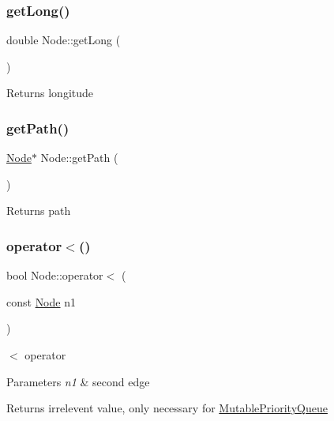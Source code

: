 \subsubsection{\texorpdfstring{get\+Long()}{getLong()}}
{\footnotesize\ttfamily double Node\+::get\+Long (\begin{DoxyParamCaption}{ }\end{DoxyParamCaption})\hspace{0.3cm}{\ttfamily [inline]}}

\begin{DoxyReturn}{Returns}
longitude 
\end{DoxyReturn}
\mbox{\label{class_node_a419e5f9cbdea4b8f285d6dd841b92a2d}} 
\subsubsection{\texorpdfstring{get\+Path()}{getPath()}}
{\footnotesize\ttfamily \mbox{\hyperlink{class_node}{Node}}$\ast$ Node\+::get\+Path (\begin{DoxyParamCaption}{ }\end{DoxyParamCaption})\hspace{0.3cm}{\ttfamily [inline]}}

\begin{DoxyReturn}{Returns}
path 
\end{DoxyReturn}
\mbox{\label{class_node_ae72c904e058406e2c1c49e51e487ebd1}} 
\subsubsection{\texorpdfstring{operator$<$()}{operator<()}}
{\footnotesize\ttfamily bool Node\+::operator$<$ (\begin{DoxyParamCaption}\item[{const \mbox{\hyperlink{class_node}{Node}}}]{n1 }\end{DoxyParamCaption})\hspace{0.3cm}{\ttfamily [inline]}}



$<$ operator 


\begin{DoxyParams}{Parameters}
{\em n1} & second edge \\
\hline
\end{DoxyParams}
\begin{DoxyReturn}{Returns}
irrelevent value, only necessary for \mbox{\hyperlink{class_mutable_priority_queue}{Mutable\+Priority\+Queue}} 
\end{DoxyReturn}
\mbox{\label{class_node_a1e6c8f645d5ef4855f4cc56eaeba33e2}} 
